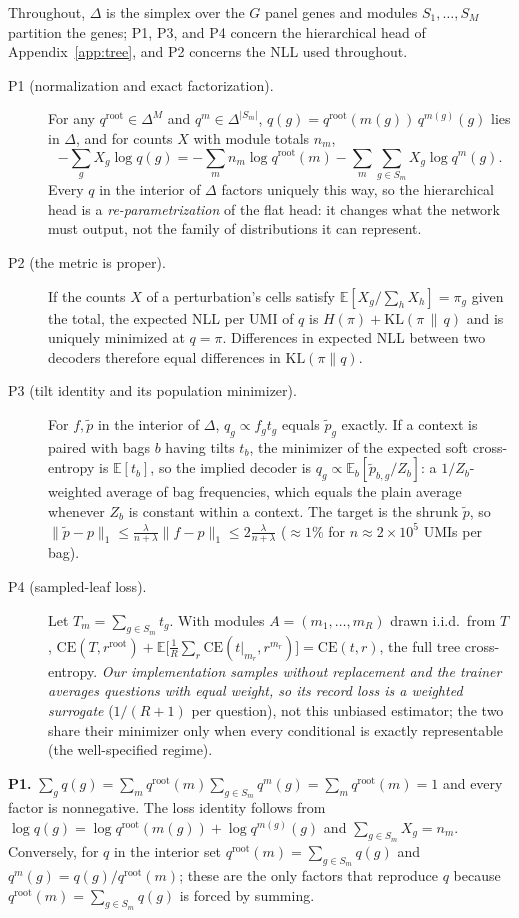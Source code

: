 \documentclass[10pt]{article}
\begin{document}
Throughout, $\Delta$ is the simplex over the $G$ panel genes and modules $S_1,\dots,S_M$ partition the genes; P1, P3, and P4 concern the hierarchical head of Appendix~\ref{app:tree}, and P2 concerns the NLL used throughout.
\begin{description}
\item[P1 (normalization and exact factorization).] For any $q^{\mathrm{root}}\in\Delta^{M}$ and $q^{m}\in\Delta^{|S_m|}$, $q(g)=q^{\mathrm{root}}(m(g))\,q^{m(g)}(g)$ lies in $\Delta$, and for counts $X$ with module totals $n_m$,
\[-\sum_gX_g\log q(g)=-\sum_mn_m\log q^{\mathrm{root}}(m)-\sum_m\sum_{g\in S_m}X_g\log q^m(g).\]
Every $q$ in the interior of $\Delta$ factors uniquely this way, so the hierarchical head is a \emph{re-parametrization} of the flat head: it changes what the network must output, not the family of distributions it can represent.
\item[P2 (the metric is proper).] If the counts $X$ of a perturbation's cells satisfy $\mathbb{E}[X_g/\sum_hX_h]=\pi_g$ given the total, the expected NLL per UMI of $q$ is $H(\pi)+\mathrm{KL}(\pi\,\|\,q)$ and is uniquely minimized at $q=\pi$. Differences in expected NLL between two decoders therefore equal differences in $\mathrm{KL}(\pi\|q)$.
\item[P3 (tilt identity and its population minimizer).] For $f,\tilde p$ in the interior of $\Delta$, $q_g\propto f_gt_g$ equals $\tilde p_g$ exactly. If a context is paired with bags $b$ having tilts $t_b$, the minimizer of the expected soft cross-entropy is $\mathbb{E}[t_b]$, so the implied decoder is $q_g\propto\mathbb{E}_b[\tilde p_{b,g}/Z_b]$: a $1/Z_b$-weighted average of bag frequencies, which equals the plain average whenever $Z_b$ is constant within a context. The target is the shrunk $\tilde p$, so $\lVert\tilde p-p\rVert_1\le\tfrac{\lambda}{n+\lambda}\lVert f-p\rVert_1\le2\tfrac{\lambda}{n+\lambda}$ ($\approx1\%$ for $n\approx2\!\times\!10^5$ UMIs per bag).
\item[P4 (sampled-leaf loss).] Let $T_m=\sum_{g\in S_m}t_g$. With modules $A=(m_1,\dots,m_R)$ drawn i.i.d.\ from $T$, $\mathrm{CE}(T,r^{\mathrm{root}})+\mathbb{E}\big[\tfrac1R\sum_{r}\mathrm{CE}(t|_{m_r},r^{m_r})\big]=\mathrm{CE}(t,r)$, the full tree cross-entropy. \emph{Our implementation samples without replacement and the trainer averages questions with equal weight, so its record loss is a weighted surrogate} ($1/(R{+}1)$ per question), not this unbiased estimator; the two share their minimizer only when every conditional is exactly representable (the well-specified regime).
\end{description}
\textbf{P1.} $\sum_gq(g)=\sum_mq^{\mathrm{root}}(m)\sum_{g\in S_m}q^m(g)=\sum_mq^{\mathrm{root}}(m)=1$ and every factor is nonnegative. The loss identity follows from $\log q(g)=\log q^{\mathrm{root}}(m(g))+\log q^{m(g)}(g)$ and $\sum_{g\in S_m}X_g=n_m$. Conversely, for $q$ in the interior set $q^{\mathrm{root}}(m)=\sum_{g\in S_m}q(g)$ and $q^m(g)=q(g)/q^{\mathrm{root}}(m)$; these are the only factors that reproduce $q$ because $q^{\mathrm{root}}(m)=\sum_{g\in S_m}q(g)$ is forced by summing.
\end{document}
